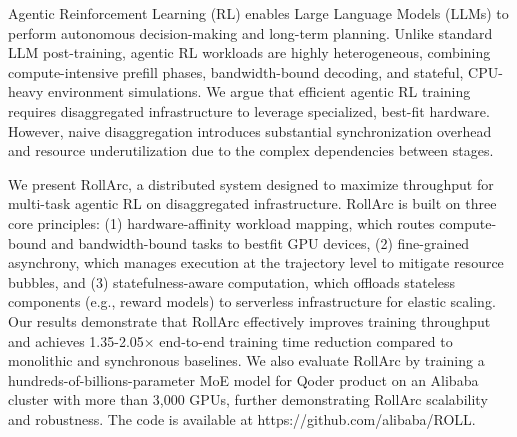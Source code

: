 \maketitle
\def\thefootnote{*}

\setlength{\floatsep}{3pt plus 2pt minus 1pt}
\setlength{\textfloatsep}{3pt plus 2pt minus 1pt}
\setlength{\intextsep}{3pt plus 2pt minus 1pt}
\setlength{\abovecaptionskip}{3pt plus 2pt minus 2pt}
\setlength{\belowcaptionskip}{3pt plus 2pt minus 2pt}
\setlength{\abovedisplayskip}{3pt plus 2pt minus 2pt}
\setlength{\belowdisplayskip}{3pt plus 2pt minus 2pt}







\lstset{basicstyle=\scriptsize\ttfamily}


% 











Agentic Reinforcement Learning (RL) enables Large Language Models (LLMs) to perform autonomous decision-making and long-term planning. Unlike standard LLM post-training, agentic RL workloads are highly heterogeneous, combining compute-intensive prefill phases, bandwidth-bound decoding, and stateful, CPU-heavy environment simulations. We argue that efficient agentic RL training requires disaggregated infrastructure to leverage specialized, best-fit hardware. However, naive disaggregation introduces substantial synchronization overhead and resource underutilization due to the complex dependencies between stages.

We present RollArc, a distributed system designed to maximize throughput for multi-task agentic RL on disaggregated infrastructure. RollArc is built on three core principles: (1) hardware-affinity workload mapping, which routes compute-bound and bandwidth-bound tasks to bestfit GPU devices, (2) fine-grained asynchrony, which manages execution at the trajectory level to mitigate resource bubbles, and (3) statefulness-aware computation, which offloads stateless components (e.g., reward models) to serverless infrastructure for elastic scaling. Our results demonstrate that RollArc effectively improves training throughput and achieves 1.35-2.05\(\times\) end-to-end training time reduction compared to monolithic and synchronous baselines. We also evaluate RollArc by training a hundreds-of-billions-parameter MoE model for Qoder product on an Alibaba cluster with more than 3,000 GPUs, further demonstrating RollArc scalability and robustness. The code is available at https://github.com/alibaba/ROLL.